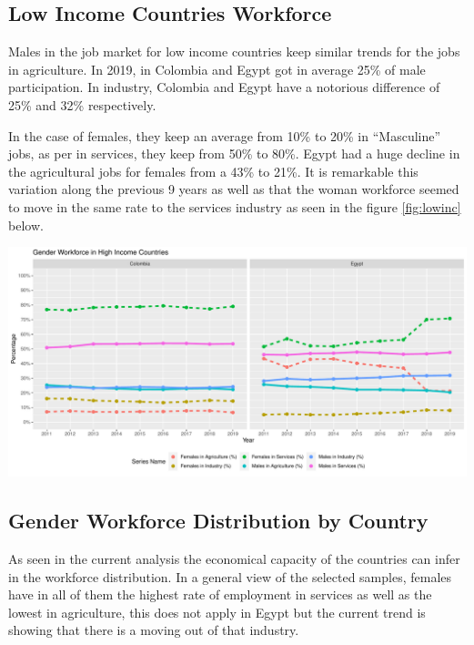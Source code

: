 \documentclass[11pt,a4paper,]{article}
\let\origfigure\figure
\let\endorigfigure\endfigure
\renewenvironment{figure}[1][2] {
    \expandafter\origfigure\expandafter[H]
} {
    \endorigfigure
}
\begin{document}
\hypertarget{low-income-countries-workforce}{%
\subsection{Low Income Countries Workforce}\label{low-income-countries-workforce}}

Males in the job market for low income countries keep similar trends for the jobs in agriculture. In 2019, in Colombia and Egypt got in average 25\% of male participation. In industry, Colombia and Egypt have a notorious difference of 25\% and 32\% respectively.

In the case of females, they keep an average from 10\% to 20\% in ``Masculine'' jobs, as per in services, they keep from 50\% to 80\%. Egypt had a huge decline in the agricultural jobs for females from a 43\% to 21\%. It is remarkable this variation along the previous 9 years as well as that the woman workforce seemed to move in the same rate to the services industry as seen in the figure \ref{fig:lowinc} below. \autocite{WDAgriculture}

\begin{figure}
\centering
\includegraphics{The_Outsiders_5513_files/figure-latex/lowinc-1.pdf}
\caption{\label{fig:lowinc}Low Income Countries Workforce}
\end{figure}

\hypertarget{gender-workforce-distribution-by-country}{%
\subsection{Gender Workforce Distribution by Country}\label{gender-workforce-distribution-by-country}}

As seen in the current analysis the economical capacity of the countries can infer in the workforce distribution. In a general view of the selected samples, females have in all of them the highest rate of employment in services as well as the lowest in agriculture, this does not apply in Egypt but the current trend is showing that there is a moving out of that industry.
\end{document}
